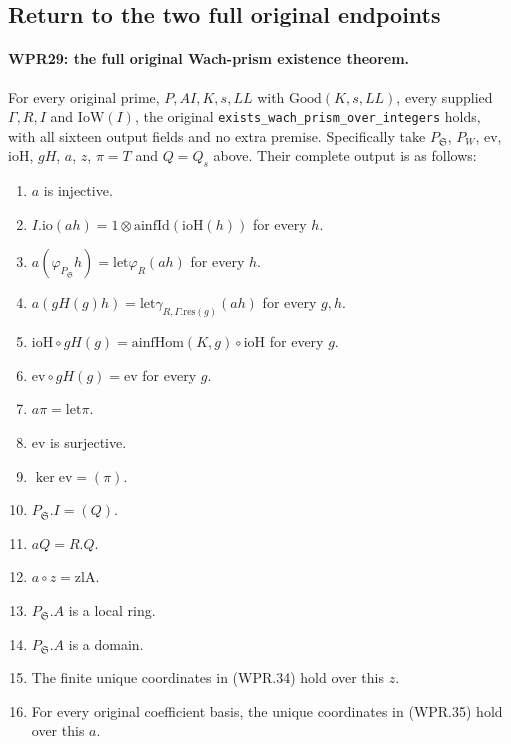 \documentclass[11pt,a4paper]{article}
\numberwithin{equation}{section}
\theoremstyle{remark}\newtheorem{remark}[theorem]{Remark}
\begin{document}
\subsection{Return to the two full original endpoints}

\paragraph{WPR29: the full original Wach-prism existence theorem.}
\label{claim:WPR29}
For every original prime, $P,AI,K,s,LL$ with
$\mathrm{Good}(K,s,LL)$, every supplied $\Gamma,R,I$ and
$\mathrm{IoW}(I)$, the original
\texttt{exists\_\allowbreak wach\_\allowbreak prism\_\allowbreak over\_\allowbreak integers}
holds, with all sixteen output fields and no extra premise.
Specifically take $P_{\mathfrak S}$, $P_W$, $\mathrm{ev}$,
$\mathrm{ioH}$, $gH$, $a$, $z$, $\pi=T$ and $Q=Q_s$ above.
Their complete output is as follows:
\begin{enumerate}
\item $a$ is injective.
\item $I.\mathrm{io}(a h)=1\otimes\mathrm{ainfId}(\mathrm{ioH}(h))$
for every $h$.
\item $a(\varphi_{P_{\mathfrak S}}h)=\mathrm{let}\varphi_R(a h)$
for every $h$.
\item $a(gH(g)h)=\mathrm{let}\gamma_{R,\Gamma.\mathrm{res}(g)}(a h)$
for every $g,h$.
\item $\mathrm{ioH}\circ gH(g)=\mathrm{ainfHom}(K,g)\circ\mathrm{ioH}$
for every $g$.
\item $\mathrm{ev}\circ gH(g)=\mathrm{ev}$ for every $g$.
\item $a\pi=\mathrm{let}\pi$.
\item $\mathrm{ev}$ is surjective.
\item $\ker\mathrm{ev}=(\pi)$.
\item $P_{\mathfrak S}.I=(Q)$.
\item $aQ=R.Q$.
\item $a\circ z=\mathrm{zlA}$.
\item $P_{\mathfrak S}.A$ is a local ring.
\item $P_{\mathfrak S}.A$ is a domain.
\item The finite unique coordinates in (WPR.34) hold over this $z$.
\item For every original coefficient basis, the unique coordinates
in (WPR.35) hold over this $a$.
\end{enumerate}
\end{document}
